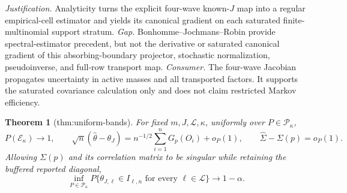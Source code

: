\documentclass{article}
\newtheorem{theorem}{Theorem}
\begin{document}
\par\smallskip\noindent \textit{Justification.} Analyticity turns the explicit four-wave known-\(J\) map into a regular empirical-cell estimator and yields its canonical gradient on each saturated finite-multinomial support stratum. \textit{Gap.} Bonhomme--Jochmans--Robin provide spectral-estimator precedent, but not the derivative or saturated canonical gradient of this absorbing-boundary projector, stochastic normalization, pseudoinverse, and full-row transport map. \textit{Consumer.} The four-wave Jacobian propagates uncertainty in active masses and all transported factors.  It supports the saturated covariance calculation only and does not claim restricted Markov efficiency.

\begin{theorem}[thm:uniform-bands]\label{thm:uniform-bands}
For fixed \(m,J,\mathcal L,\kappa\), uniformly over \(P\in\mathcal P_\kappa\),
\[
 P(\mathcal E_\kappa)\to1,\qquad
 \sqrt n(\widehat\theta-\theta_J)=n^{-1/2}\sum_{i=1}^nG_p(O_i)+o_P(1),
 \qquad \widehat\Sigma-\Sigma(p)=o_P(1).
\]
Allowing \(\Sigma(p)\) and its correlation matrix to be singular while retaining the buffered reported diagonal,
\[
 \inf_{P\in\mathcal P_\kappa}P\{\theta_{J,\ell}\in I_{\ell,n}
 \text{ for every }\ell\in\mathcal L\}\longrightarrow1-\alpha.
\]
\end{theorem}
\end{document}
